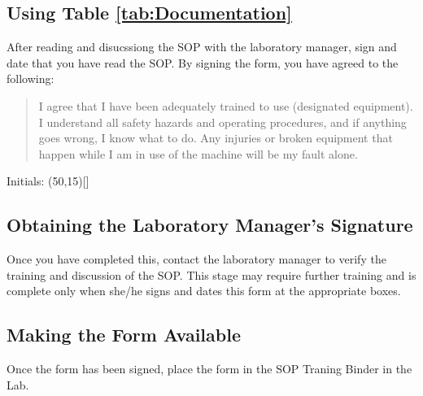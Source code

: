 \documentclass{article}
\begin{document}
\subsection{Using Table \ref{tab:Documentation}}

After reading and disucssiong the SOP with the laboratory manager, sign and date that you have read the SOP. By signing the form, you have agreed to the following: 

\begin{quote} 
I agree that I have been adequately trained to use (designated equipment). I understand all safety hazards and operating procedures, and if anything goes wrong, I know what to do. Any injuries or broken equipment that happen while I am in use of the machine will be my fault alone.
\end{quote}

Initials: \framebox(50,15)[]{}

\subsection{Obtaining the Laboratory Manager's Signature}
Once you have completed this, contact the laboratory manager to verify the training and discussion of the SOP. This stage may require further training and is complete only when she/he signs and dates this form at the appropriate boxes. 

\subsection{Making the Form Available}

Once the form has been signed, place the form in the SOP Traning Binder in the Lab. 
\end{document}
